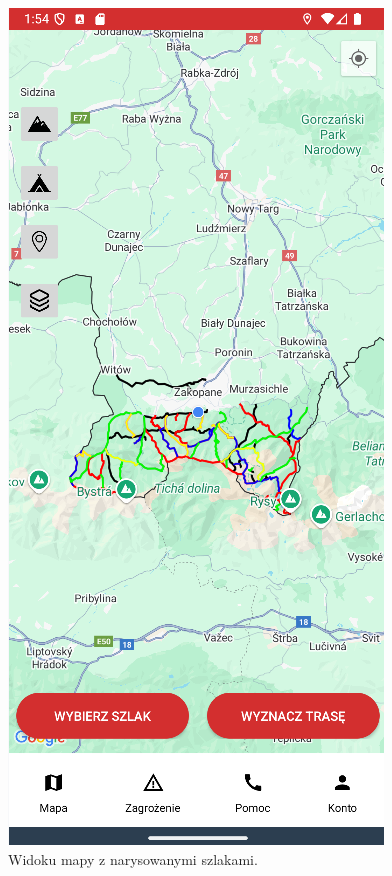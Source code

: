 \begin{figure}[H]
    \centering
    \includegraphics[scale=0.6]{img/imp/widok-mapa.png}
    \caption{Widoku mapy z narysowanymi szlakami.}
    \label{widok:map}
\end{figure}

